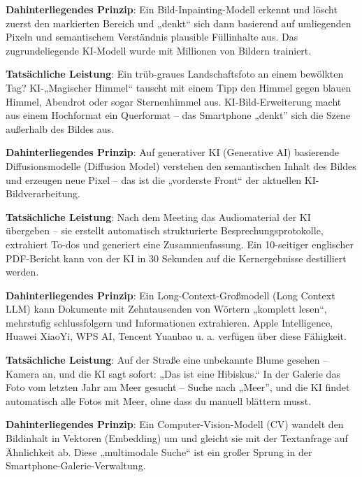\textbf{Dahinterliegendes Prinzip}: Ein Bild-Inpainting-Modell erkennt und löscht zuerst den markierten Bereich und „denkt“ sich dann basierend auf umliegenden Pixeln und semantischem Verständnis plausible Füllinhalte aus. Das zugrundeliegende KI-Modell wurde mit Millionen von Bildern trainiert.


\textbf{Tatsächliche Leistung}: Ein trüb-graues Landschaftsfoto an einem bewölkten Tag? KI-„Magischer Himmel“ tauscht mit einem Tipp den Himmel gegen blauen Himmel, Abendrot oder sogar Sternenhimmel aus. KI-Bild-Erweiterung macht aus einem Hochformat ein Querformat – das Smartphone „denkt” sich die Szene außerhalb des Bildes aus.

\textbf{Dahinterliegendes Prinzip}: Auf generativer KI (Generative AI) basierende Diffusionsmodelle (Diffusion Model) verstehen den semantischen Inhalt des Bildes und erzeugen neue Pixel – das ist die „vorderste Front“ der aktuellen KI-Bildverarbeitung.


\textbf{Tatsächliche Leistung}: Nach dem Meeting das Audiomaterial der KI übergeben – sie erstellt automatisch strukturierte Besprechungsprotokolle, extrahiert To-dos und generiert eine Zusammenfassung. Ein 10-seitiger englischer PDF-Bericht kann von der KI in 30 Sekunden auf die Kernergebnisse destilliert werden.

\textbf{Dahinterliegendes Prinzip}: Ein Long-Context-Großmodell (Long Context LLM) kann Dokumente mit Zehntausenden von Wörtern „komplett lesen“, mehrstufig schlussfolgern und Informationen extrahieren. Apple Intelligence, Huawei XiaoYi, WPS AI, Tencent Yuanbao u. a. verfügen über diese Fähigkeit.


\textbf{Tatsächliche Leistung}: Auf der Straße eine unbekannte Blume gesehen – Kamera an, und die KI sagt sofort: „Das ist eine Hibiskus.“ In der Galerie das Foto vom letzten Jahr am Meer gesucht – Suche nach „Meer”, und die KI findet automatisch alle Fotos mit Meer, ohne dass du manuell blättern musst.

\textbf{Dahinterliegendes Prinzip}: Ein Computer-Vision-Modell (CV) wandelt den Bildinhalt in Vektoren (Embedding) um und gleicht sie mit der Textanfrage auf Ähnlichkeit ab. Diese „multimodale Suche“ ist ein großer Sprung in der Smartphone-Galerie-Verwaltung.

